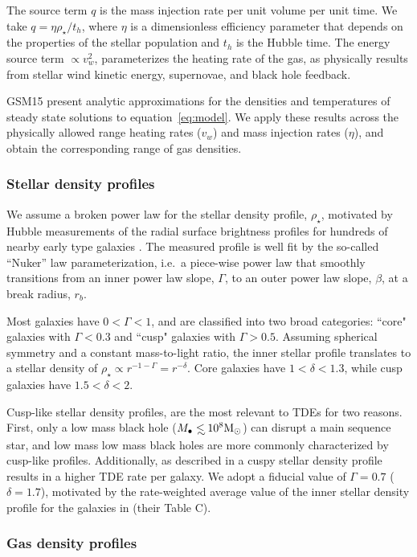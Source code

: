 \documentclass[usenatbib,fleqn]{mnras}
\newcommand\lsim{\mathrel{\rlap{\lower4pt\hbox{\hskip1pt$\sim$}}
    \raise1pt\hbox{$<$}}}
\newcommand{\Mbh}[1][]{M_{\bullet#1}}
\newcommand{\Msun}{{\rm M_\odot}}
\begin{document}
The source term $q$ is the mass injection rate per unit volume per
unit time. We take $q=\eta \rho_{\star}/t_h$, where $\eta$ is a
dimensionless efficiency parameter that depends on the properties of
the stellar population and $t_h$ is the Hubble time. The energy source
term $\propto v_w^{2}$, parameterizes the heating rate of the gas, as
physically results from stellar wind kinetic energy, supernovae, and
black hole feedback.

GSM15 present analytic approximations for the
densities and temperatures of steady state solutions to
equation~\eqref{eq:model}. We apply these results across the
physically allowed range heating rates ($v_w$) and mass injection
rates ($\eta$), and obtain the corresponding range of gas densities.

\subsubsection{Stellar density profiles}
We assume a broken power law for the stellar density profile,
$\rho_{\star}$, motivated by Hubble measurements of the radial surface
brightness profiles for hundreds of nearby early type galaxies
\citep{Lauer+2007}.  The measured profile is well fit by the so-called
``Nuker'' law parameterization, i.e.~a piece-wise power law that smoothly
transitions from an inner power law slope, $\Gamma$, to an outer power
law slope, $\beta$, at a break radius, $r_b$.

Most galaxies have $0<\Gamma<1$, and are classified into two broad
categories: ``core" galaxies with $\Gamma<0.3$ and ``cusp" galaxies with
$\Gamma>0.5$. Assuming spherical symmetry and a constant mass-to-light
ratio, the inner stellar profile translates to a stellar density of
$\rho_\star\propto r^{-1-\Gamma}=r^{-\delta}$. Core galaxies have
$1<\delta<1.3$, while cusp galaxies have $1.5<\delta<2$.

Cusp-like stellar density profiles, are the most relevant to TDEs for
two reasons.  First, only a low mass black hole ($\Mbh\lsim 10^8
\Msun$) can disrupt a main sequence star, and low mass low mass black
holes are more commonly characterized by cusp-like profiles.
Additionally, as described in \citet{Stone&Metzger2016} a cuspy
stellar density profile results in a higher TDE rate per galaxy.  We
adopt a fiducial value of $\Gamma=0.7$ ($\delta=1.7$), motivated by
the rate-weighted average value of the inner stellar density profile
for the galaxies in \citet{Stone&Metzger2016} (their Table C).


\subsubsection{Gas density profiles}
\end{document}
